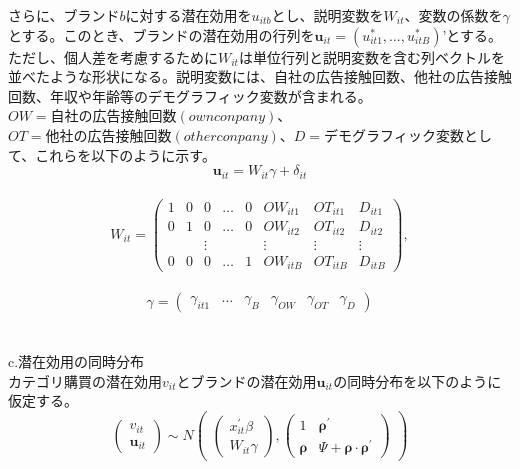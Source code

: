 \documentclass[11pt]{jsarticle}
\begin{document}
さらに、ブランド$b$に対する潜在効用を$u_{itb}$とし、説明変数を$W_{it}$、変数の係数を$\gamma$ とする。このとき、ブランドの潜在効用の行列を$\textbf{u}_{it} = (u_{it1}^{*},...,u_{itB}^{*})’$とする。ただし、個人差を考慮するために$W_{it}$は単位行列と説明変数を含む列ベクトルを並べたような形状になる。説明変数には、自社の広告接触回数、他社の広告接触回数、年収や年齢等のデモグラフィック変数が含まれる。$OW = 自社の広告接触回数(own conpany)$、$OT = 他社の広告接触回数(other conpany)$、$D =デモグラフィック変数$として、これらを以下のように示す。\\
\begin{equation} \label{formulab2}
\textbf{u}_{it} = W_{it}\gamma + \delta_{it}
\end{equation}\\
\begin{equation} \label{formulab3}
  W_{it} =
  \begin{pmatrix}
      1 & 0 & 0 & \ldots & 0 & OW_{it1} & OT_{it1} & D_{it1} \\
      0 & 1 & 0 & \ldots & 0 & OW_{it2} & OT_{it2} & D_{it2} \\
       &  & \vdots &  &  & \vdots & \vdots & \vdots \\
      0 & 0 & 0 & \ldots & 1 & OW_{itB} & OT_{itB} & D_{itB}
    \end{pmatrix}
    ,
\end{equation}\\
\begin{equation} \label{formulab4}
  \gamma =
  \begin{pmatrix}
      \gamma_{it1} & \ldots & \gamma_{B} & \gamma_{OW} & \gamma_{OT} & \gamma_{D}
   \end{pmatrix}
\end{equation}\\
\\
c.潜在効用の同時分布\\
カテゴリ購買の潜在効用$v_{it}$とブランドの潜在効用$\textbf{u}_{it}$の同時分布を以下のように仮定する。\\
\begin{equation} \label{formulac1}
  \begin{pmatrix}
      v_{it} \\
      \textbf{u}_{it} 
   \end{pmatrix}
   \sim N
  \begin{pmatrix}
    \begin{pmatrix}
    x^{\prime}_{it}\beta\\
    W_{it}\gamma
    \end{pmatrix}
    ,
    \begin{pmatrix}
    1 & {\boldsymbol \rho}^\prime\\
    {\boldsymbol \rho} & \Psi + {\boldsymbol \rho} \cdot {\boldsymbol \rho}^\prime
    \end{pmatrix}
  \end{pmatrix}
\end{equation}\\
\end{document}
